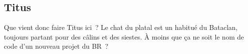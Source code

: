 \subsection{Titus}

\label{titus}
Que vient donc faire Titus ici~? Le chat du platal est un habitué du Bataclan, toujours partant pour des câlins et des siestes. À moins que ça ne soit le nom de code d'un nouveau projet du BR~?
